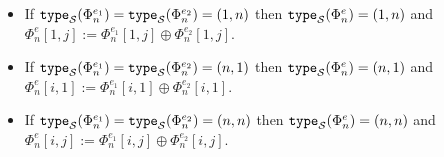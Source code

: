 \begin{itemize}
\begin{itemize}
  \item If $\texttt{type}_{\mathcal{S}}(\Phi^{e_1}_n)=\texttt{type}_{\mathcal{S}}(\Phi^{e_2}_n)=(1, n)$  then $\texttt{type}_{\mathcal{S}}(\Phi^{e}_n)=(1, n)$ and $\Phi^e_n[1,j]:=\Phi^{e_1}_n[1,j] \oplus \Phi^{e_2}_n[1,j]$.
  \item If $\texttt{type}_{\mathcal{S}}(\Phi^{e_1}_n)=\texttt{type}_{\mathcal{S}}(\Phi^{e_2}_n)=(n, 1)$  then $\texttt{type}_{\mathcal{S}}(\Phi^{e}_n)=(n, 1)$ and $\Phi^e_n[i,1]:=\Phi^{e_1}_n[i,1] \oplus \Phi^{e_2}_n[i,1]$.
  \item If $\texttt{type}_{\mathcal{S}}(\Phi^{e_1}_n)=\texttt{type}_{\mathcal{S}}(\Phi^{e_2}_n)=(n, n)$  then $\texttt{type}_{\mathcal{S}}(\Phi^{e}_n)=(n, n)$ and $\Phi^e_n[i,j]:=\Phi^{e_1}_n[i,j] \oplus \Phi^{e_2}_n[i,j]$.
\end{itemize}
%
%

\end{itemize}
